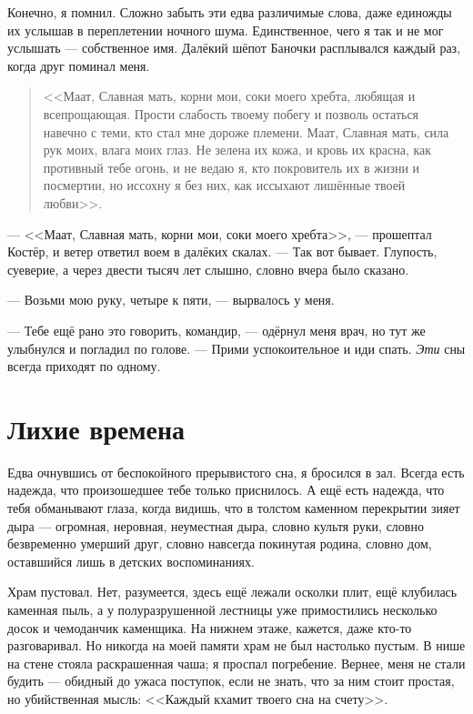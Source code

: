 Конечно, я помнил.
Сложно забыть эти едва различимые слова, даже единожды их услышав в переплетении ночного шума.
Единственное, чего я так и не мог услышать --- собственное имя.
Далёкий шёпот Баночки расплывался каждый раз, когда друг поминал меня.

\begin{quote}
<<Маат, Славная мать, корни мои, соки моего хребта, любящая и всепрощающая.
Прости слабость твоему побегу и позволь остаться навечно с теми, кто стал мне дороже племени.
Маат, Славная мать, сила рук моих, влага моих глаз.
Не зелена их кожа, и кровь их красна, как противный тебе огонь, и не ведаю я, кто покровитель их в жизни и посмертии, но иссохну я без них, как иссыхают лишённые твоей любви>>.
\end{quote}

--- <<Маат, Славная мать, корни мои, соки моего хребта>>, --- прошептал Костёр, и ветер ответил воем в далёких скалах.
--- Так вот бывает.
Глупость, суеверие, а через двести тысяч лет слышно, словно вчера было сказано.

--- Возьми мою руку, четыре к пяти, --- вырвалось у меня.

--- Тебе ещё рано это говорить, командир, --- одёрнул меня врач, но тут же улыбнулся и погладил по голове.
--- Прими успокоительное и иди спать.
\emph{Эти} сны всегда приходят по одному.

\section{Лихие времена}

Едва очнувшись от беспокойного прерывистого сна, я бросился в зал.
Всегда есть надежда, что произошедшее тебе только приснилось.
А ещё есть надежда, что тебя обманывают глаза, когда видишь, что в толстом каменном перекрытии зияет дыра --- огромная, неровная, неуместная дыра, словно культя руки, словно безвременно умерший друг, словно навсегда покинутая родина, словно дом, оставшийся лишь в детских воспоминаниях.

Храм пустовал.
Нет, разумеется, здесь ещё лежали осколки плит, ещё клубилась каменная пыль, а у полуразрушенной лестницы уже примостились несколько досок и чемоданчик каменщика.
На нижнем этаже, кажется, даже кто-то разговаривал.
Но никогда на моей памяти храм не был настолько пустым.
В нише на стене стояла раскрашенная чаша;
я проспал погребение.
Вернее, меня не стали будить --- обидный до ужаса поступок, если не знать, что за ним стоит простая, но убийственная мысль: <<Каждый кхамит твоего сна на счету>>.


